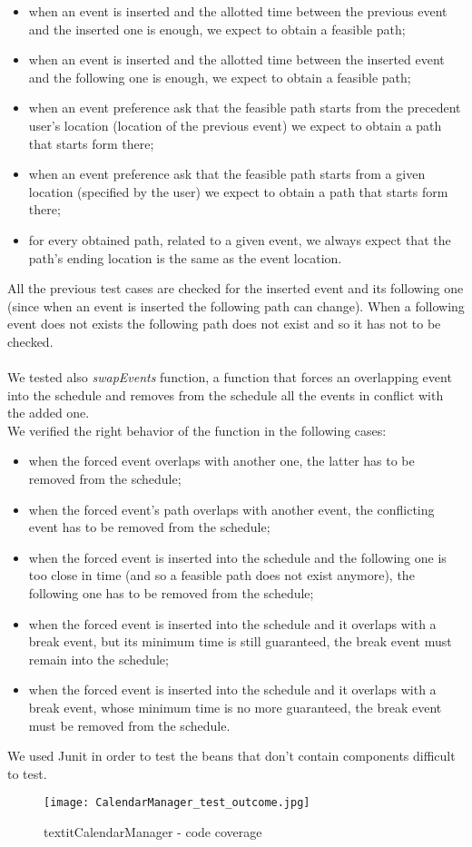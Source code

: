 \begin{itemize}
	\item when an event is inserted and the allotted time between the previous event and the inserted one is enough, we expect to obtain a feasible path;
	\item when an event is inserted and the allotted time between the inserted event and the following one is enough, we expect to obtain a feasible path;
	\item when an event preference ask that the feasible path starts from the precedent user's location (location of the previous event) we expect to obtain a path that starts form there;
	\item when an event preference ask that the feasible path starts from a given location (specified by the user) we expect to obtain a path that starts form there;
	\item for every obtained path, related to a given event, we always expect that the path's ending location is the same as the event location.
\end{itemize}
\noindent
All the previous test cases are checked for the inserted event and its following one (since when an event is inserted the following path can change). When a following event does not exists the following path does not exist and so it has not to be checked. \\ \\
\noindent
We tested also \textit{swapEvents} function, a function that forces an overlapping event into the schedule and removes from the schedule all the events in conflict with the added one. \\
We verified the right behavior of the function in the following cases:
\begin{itemize}
	\item when the forced event overlaps with another one, the latter has to be removed from the schedule;
	\item when the forced event's path overlaps with another event, the conflicting event has to be removed from the schedule;
	\item when the forced event is inserted into the schedule and the following one is too close in time (and so a feasible path does not exist anymore), the following one has to be removed from the schedule;
	\item when the forced event is inserted into the schedule and it overlaps with a break event, but its minimum time is still guaranteed, the break event must remain into the schedule;
	\item when the forced event is inserted into the schedule and it overlaps with a break event, whose minimum time is no more guaranteed, the break event must be removed from the schedule. \\
\end{itemize}
We used Junit in order to test the beans that don't contain components difficult to test.
\begin{figure}[H]
	\begin{center}
		\texttt{[image: CalendarManager\_test\_outcome.jpg]}
	\end{center}
\caption{ textit{CalendarManager} - code coverage}
\end{figure}


